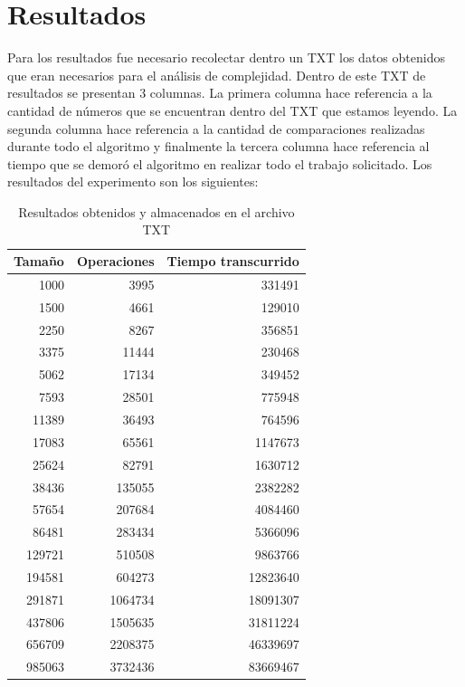 \section{Resultados}
Para los resultados fue necesario recolectar dentro un TXT los datos obtenidos que eran necesarios para el análisis de complejidad. Dentro de este TXT de resultados se presentan 3 columnas. La primera columna hace referencia a la cantidad de números que se encuentran dentro del TXT que estamos leyendo. La segunda columna hace referencia a la cantidad de comparaciones realizadas durante todo el algoritmo y finalmente la tercera columna hace referencia al tiempo que se demoró el algoritmo en realizar todo el trabajo solicitado. Los resultados del experimento son los siguientes:\\


\begin{table}[H]	%
	\centering	%
	\caption{
		Resultados obtenidos y almacenados en el archivo TXT
	}	%

	\begin{tabular}{r r r}
		Tamaño & Operaciones & Tiempo transcurrido \\ 
		\hline 
		1000 & 3995 &  331491 \\
		1500 & 4661 &  129010 \\
		2250& 8267 &  356851 \\
		3375& 11444 & 230468 \\
		5062& 17134&  349452 \\
	    7593 & 28501 & 775948 \\
	    11389 & 36493 & 764596 \\
	    17083 & 65561 & 1147673 \\
	    25624 & 82791 & 1630712 \\
	    38436 & 135055 & 2382282 \\
	    57654 & 207684 & 4084460 \\
	    86481 & 283434 & 5366096 \\
	    129721 & 510508 & 9863766 \\
	    194581 & 604273 & 12823640 \\
	    291871 & 1064734 & 18091307 \\
	    437806 & 1505635 & 31811224 \\
	    656709 & 2208375 & 46339697 \\
	    985063 & 3732436 & 83669467 \\
	        
	\end{tabular}

\end{table}

